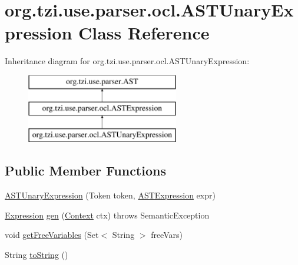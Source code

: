 \hypertarget{classorg_1_1tzi_1_1use_1_1parser_1_1ocl_1_1_a_s_t_unary_expression}{\section{org.\-tzi.\-use.\-parser.\-ocl.\-A\-S\-T\-Unary\-Expression Class Reference}
\label{classorg_1_1tzi_1_1use_1_1parser_1_1ocl_1_1_a_s_t_unary_expression}
}
Inheritance diagram for org.\-tzi.\-use.\-parser.\-ocl.\-A\-S\-T\-Unary\-Expression\-:\begin{figure}[H]
\begin{center}
\leavevmode
\includegraphics[height=3.000000cm]{classorg_1_1tzi_1_1use_1_1parser_1_1ocl_1_1_a_s_t_unary_expression}
\end{center}
\end{figure}
\subsection*{Public Member Functions}
\begin{DoxyCompactItemize}
\item 
\hyperlink{classorg_1_1tzi_1_1use_1_1parser_1_1ocl_1_1_a_s_t_unary_expression_a7551a0ea200d47c5ab0b51e2dc1f746c}{A\-S\-T\-Unary\-Expression} (Token token, \hyperlink{classorg_1_1tzi_1_1use_1_1parser_1_1ocl_1_1_a_s_t_expression}{A\-S\-T\-Expression} expr)
\item 
\hyperlink{classorg_1_1tzi_1_1use_1_1uml_1_1ocl_1_1expr_1_1_expression}{Expression} \hyperlink{classorg_1_1tzi_1_1use_1_1parser_1_1ocl_1_1_a_s_t_unary_expression_ae4093c6736ad7e2697590d7b866a4cd7}{gen} (\hyperlink{classorg_1_1tzi_1_1use_1_1parser_1_1_context}{Context} ctx)  throws Semantic\-Exception 
\item 
void \hyperlink{classorg_1_1tzi_1_1use_1_1parser_1_1ocl_1_1_a_s_t_unary_expression_a8470f09ffac3987619ed314673e9327a}{get\-Free\-Variables} (Set$<$ String $>$ free\-Vars)
\item 
String \hyperlink{classorg_1_1tzi_1_1use_1_1parser_1_1ocl_1_1_a_s_t_unary_expression_aa0312308b53f181ccbbda89803f9b4d2}{to\-String} ()
\end{DoxyCompactItemize}
